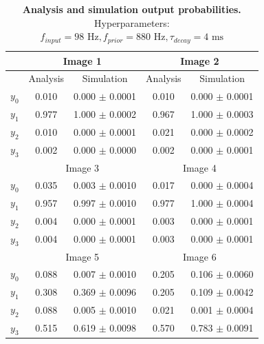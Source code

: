 \begin{table}[]
\centering
\label{tab:doubleSize_98_880_4}
\small
\tabcolsep=0.11cm
\begin{tabular}{|c|cc|cc|}
\hline
                       & \multicolumn{2}{c|}{Image 1}                       & \multicolumn{2}{c|}{Image 2}                       \\ \hline
                       & \multicolumn{1}{c|}{Analysis} & Simulation         & \multicolumn{1}{c|}{Analysis} & Simulation         \\ \hline
$y_0$                  & \multicolumn{1}{c|}{0.010}    & 0.000 $\pm$ 0.0001 & \multicolumn{1}{c|}{0.010}    & 0.000 $\pm$ 0.0001 \\ \hline
$y_1$                  & \multicolumn{1}{c|}{0.977}    & 1.000 $\pm$ 0.0002 & \multicolumn{1}{c|}{0.967}    & 1.000 $\pm$ 0.0003 \\ \hline
$y_2$                  & \multicolumn{1}{c|}{0.010}    & 0.000 $\pm$ 0.0001 & \multicolumn{1}{c|}{0.021}    & 0.000 $\pm$ 0.0002 \\ \hline
$y_3$                  & \multicolumn{1}{c|}{0.002}    & 0.000 $\pm$ 0.0000 & \multicolumn{1}{c|}{0.002}    & 0.000 $\pm$ 0.0001 \\ \hline
                       & \multicolumn{2}{c|}{Image 3}                       & \multicolumn{2}{c|}{Image 4}                       \\ \hline
$y_0$                  & \multicolumn{1}{c|}{0.035}    & 0.003 $\pm$ 0.0010 & \multicolumn{1}{c|}{0.017}    & 0.000 $\pm$ 0.0004 \\ \hline
$y_1$                  & \multicolumn{1}{c|}{0.957}    & 0.997 $\pm$ 0.0010 & \multicolumn{1}{c|}{0.977}    & 1.000 $\pm$ 0.0004 \\ \hline
$y_2$                  & \multicolumn{1}{c|}{0.004}    & 0.000 $\pm$ 0.0001 & \multicolumn{1}{c|}{0.003}    & 0.000 $\pm$ 0.0001 \\ \hline
$y_3$                  & \multicolumn{1}{c|}{0.004}    & 0.000 $\pm$ 0.0001 & \multicolumn{1}{c|}{0.003}    & 0.000 $\pm$ 0.0001 \\ \hline
						& \multicolumn{2}{c|}{Image 5}                       & \multicolumn{2}{c|}{Image 6}                       \\ \hline
$y_0$                  & \multicolumn{1}{c|}{0.088}    & 0.007 $\pm$ 0.0010 & \multicolumn{1}{c|}{0.205}    & 0.106 $\pm$ 0.0060 \\ \hline
$y_1$                  & \multicolumn{1}{c|}{0.308}    & 0.369 $\pm$ 0.0096 & \multicolumn{1}{c|}{0.205}    & 0.109 $\pm$ 0.0042 \\ \hline
$y_2$                  & \multicolumn{1}{c|}{0.088}    & 0.005 $\pm$ 0.0010 & \multicolumn{1}{c|}{0.021}    & 0.001 $\pm$ 0.0004 \\ \hline
$y_3$                  & \multicolumn{1}{c|}{0.515}    & 0.619 $\pm$ 0.0098 & \multicolumn{1}{c|}{0.570}    & 0.783 $\pm$ 0.0091 \\ \hline
\end{tabular}
\caption{\textbf{Analysis and simulation output probabilities. } Hyperparameters: $f_{input} = 98\text{ Hz}, f_{prior} = 880\text{ Hz}, \tau_{decay} = 4\text{ ms}$}
\end{table}

